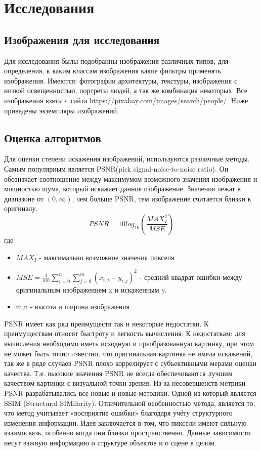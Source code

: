\section{Исследования}
\subsection{Изображения для исследования}
Для исследования былы подобранны изображения различных типов, для определения, к каким классам изображения
какие фильтры применять изображения. Имеются: фотографии архитектуры, текстуры, изображения с низкой освещенностью, портреты людей, а так же комбинация некоторых. Все изображения взяты с сайта https://pixabay.com/images/search/people/. Ниже приведены экземпляры изображений.


\subsection{Оценка алгоритмов}
Для оценки степени искажения изображений, используются различные методы. Самым популярным является PSNR(pick signal-noise-to-noise ratio). Он обозначает соотношение между максимумом возможного значения изображения и мощностью шума, который искажает данное изображение. Значения лежат в диапазоне от $(0, \infty)$, чем больше PSNR, тем изображение считается близки к оригиналу.
\begin{equation}\label{eq:PSNR}
	PSNR = 10log_{10}(\frac{MAX_I^2}{MSE})
\end{equation}
где 
\begin{itemize}
	\item $MAX_I$ - максимально возможное значения пикселя
	\item $MSE = \frac{1}{nm}\sum_{i=0}^{n}\sum_{j=0}^{m}(x_{i,j} - y_{i,j})^2$ - средний квадрат ошибки между оригинальным изображением x и искаженным y.
	\item m,n - высота и ширина изображения
\end{itemize}
PSNR имеет как ряд преимуществ так и некоторые недостатки. К преимуществам относят быстроту и легкость вычисления. К недостаткам: для вычисления необходимо иметь исходную и преобразованную картинку, при этом не может быть точно известно, что  оригинальная картинка не имела искажений, так же в ряде случаев PSNR плохо коррелирует с субъективными мерами оценки  качества. Т.е. высокие значения PSNR не всегда обеспечиваются лучшим качеством картинки с визуальной точки зрения. 
Из-за несовершенств метрики PSNR разрабатывались все новые и новые методики. Одной из который является SSIM (Structural SIMilarity). Отличительной особенностью метода, является то, что метод учитывает «восприятие ошибки» благодаря учёту структурного изменения информации. Идея заключается в том, что пиксели имеют сильную взаимосвязь, особенно когда они близки пространственно. Данные зависимости несут важную информацию о структуре объектов и о сцене в целом.
